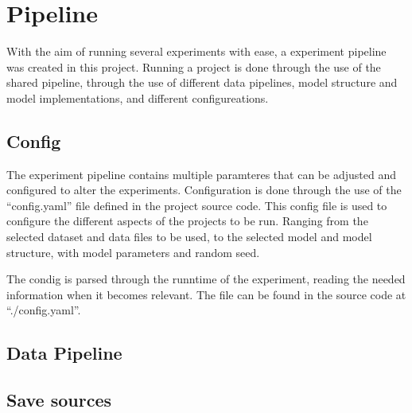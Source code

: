 \section{Pipeline}
\label{section:Method:Pipeline}


With the aim of running several experiments with ease, a experiment pipeline was created in this project.
Running a project is done through the use of the shared pipeline, through the use of different data pipelines, model structure and model implementations, and different configureations. 

\subsection{Config}
The experiment pipeline contains multiple paramteres that can be adjusted and configured to alter the experiments.
Configuration is done through the use of the ``config.yaml'' file defined in the project source code.
This config file is used to configure the different aspects of the projects to be run.
Ranging from the selected dataset and data files to be used, to the selected model and model structure, with model parameters and random seed.

The condig is parsed through the runntime of the experiment, reading the needed information when it becomes relevant.
The file can be found in the source code at ``./config.yaml''.

\subsection{Data Pipeline}




\subsection{Save sources}
